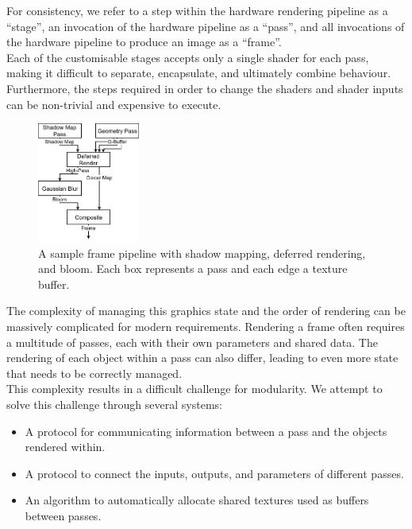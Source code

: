 \documentclass[format=sigconf]{acmart}
\begin{document}
For consistency, we refer to a step within the hardware rendering pipeline as a ``stage'', an invocation of the hardware pipeline as a ``pass'', and all invocations of the hardware pipeline to produce an image as a ``frame''. \\

Each of the customisable stages accepts only a single shader for each pass, making it difficult to separate, encapsulate, and ultimately combine behaviour. Furthermore, the steps required in order to change the shaders and shader inputs can be non-trivial and expensive to execute. \\

\begin{figure}[h]
  \begin{center}
    \includegraphics[width=0.3\textwidth]{render-pipeline.png}
  \end{center}
  \caption{A sample frame pipeline with shadow mapping, deferred rendering, and bloom. Each box represents a pass and each edge a texture buffer.}
  \label{fig:render-pipeline}
\end{figure}

The complexity of managing this graphics state and the order of rendering can be massively complicated for modern requirements. Rendering a frame often requires a multitude of passes, each with their own parameters and shared data. The rendering of each object within a pass can also differ, leading to even more state that needs to be correctly managed. \\

This complexity results in a difficult challenge for modularity. We attempt to solve this challenge through several systems:

\begin{itemize}
\item A protocol for communicating information between a pass and the objects rendered within.
\item A protocol to connect the inputs, outputs, and parameters of different passes.
\item An algorithm to automatically allocate shared textures used as buffers between passes.
\end{itemize}
\end{document}
